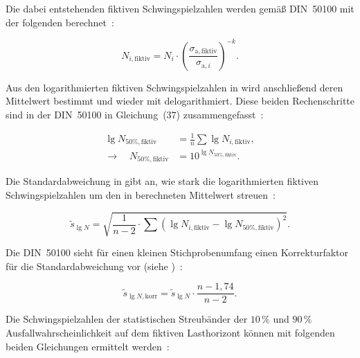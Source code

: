 Die dabei entstehenden fiktiven Schwingspielzahlen werden gemäß DIN~50100 mit der folgenden  berechnet~\cite[Seite~56]{DIN50100}:

\begin{equation}\label{eq:N_fiktiv}
    N_{i,\mathrm{fiktiv}} = N_i \cdot \left( \frac{\sigma_{\mathrm{a,fiktiv}}}{\sigma_{\mathrm{a},i}} \right)^{-k}.
\end{equation}

Aus den logarithmierten fiktiven Schwingspielzahlen in  wird anschließend deren Mittelwert bestimmt und wieder mit  delogarithmiert. Diese beiden Rechenschritte sind in der DIN~50100 in Gleichung~(37) zusammengefasst~\cite[Seite~56]{DIN50100}:

\begin{subequations}
\label{eq:gesamte_gleichung}
\begin{align}
\lg N_{50\%,\text{fiktiv}} &= \frac{1}{n} \sum \lg N_{i,\text{fiktiv}}, \label{eq:mittelwert} \\[1ex]
\rightarrow \quad N_{50\%,\text{fiktiv}} &= 10^{\lg N_{50\%,\text{fiktiv}}} \label{eq:rueckrechnung}.
\end{align}
\end{subequations}

Die Standardabweichung in  gibt an, wie stark die logarithmierten fiktiven Schwingspielzahlen um den in  berechneten Mittelwert streuen~\cite[Seite~56]{DIN50100}:

\begin{equation}\label{eq:S_Perlenschnurverfahren}
\tilde{s}_{\lg N} = \sqrt{\frac{1}{n - 2} \cdot \sum \left( \lg N_{i,\text{fiktiv}} - \lg N_{50\%,\text{fiktiv}} \right)^2}.
\end{equation}

Die DIN~50100 sieht für einen kleinen Stichprobenumfang einen Korrekturfaktor für die Standardabweichung vor (siehe )~\cite[Seite~56--57]{DIN50100}:

\begin{equation}\label{eq:s_korrektur}
\tilde{s}_{\lg N,\text{korr}} = \tilde{s}_{\lg N} \cdot \frac{n - 1{,}74}{n - 2}.
\end{equation}

Die Schwingspielzahlen der statistischen Streubänder der \(10\,\%\) und \(90\,\%\) Ausfallwahrscheinlichkeit auf dem fiktiven Lasthorizont können mit folgenden beiden Gleichungen ermittelt werden~\cite[Seite~57]{DIN50100}:

